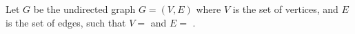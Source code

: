 Let $ G $ be the undirected graph $ G = (V,E) $ where $ V $ is the set of vertices, and $ E $ is the set of edges, such that $ V = $  and $ E = $ .